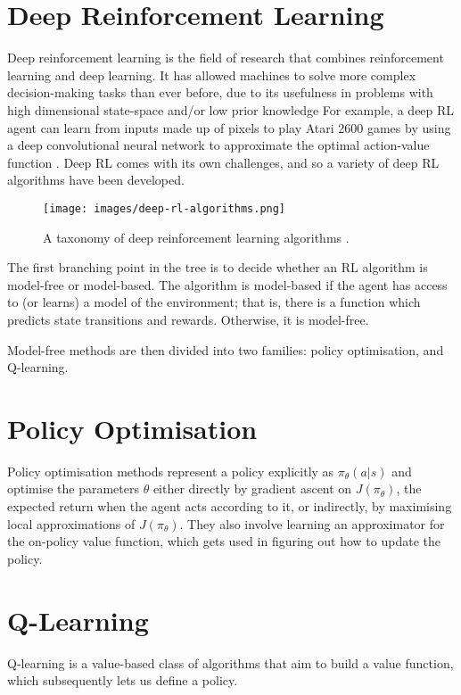 \documentclass{article}
\begin{document}
\section{Deep Reinforcement Learning}

Deep reinforcement learning is the field of research that combines reinforcement learning and deep learning. It has allowed machines to solve more complex decision-making tasks than ever before, due to its usefulness in problems with high dimensional state-space and/or low prior knowledge \cite{DBLP:journals/corr/abs-1811-12560} For example, a deep RL agent can learn from inputs made up of pixels to play Atari 2600 games by using a deep convolutional neural network to approximate the optimal action-value function \cite{Mnih2015}. Deep RL comes with its own challenges, and so a variety of deep RL algorithms have been developed.

\begin{figure}[h]
  \centering
  \texttt{[image: images/deep-rl-algorithms.png]}
  \caption{A taxonomy of deep reinforcement learning algorithms \cite{openai_2018}.}
  \label{fig:deep-rl-algorithms}
\end{figure}

The first branching point in the tree is to decide whether an RL algorithm is model-free or model-based. The algorithm is model-based if the agent has access to (or learns) a model of the environment; that is, there is a function which predicts state transitions and rewards. Otherwise, it is model-free.

Model-free methods are then divided into two families: policy optimisation, and Q-learning.

\section{Policy Optimisation \cite{openai_2018}} 

Policy optimisation methods represent a policy explicitly as $\pi_\theta(a|s)$ and optimise the parameters $\theta$ either directly by gradient ascent on $J(\pi_\theta)$, the expected return when the agent acts according to it, or indirectly, by maximising local approximations of $J(\pi_\theta)$. They also involve learning an approximator for the on-policy value function, which gets used in figuring out how to update the policy.

\section{Q-Learning}
Q-learning is a value-based class of algorithms that aim to build a value function, which subsequently lets us define a policy.
\end{document}
